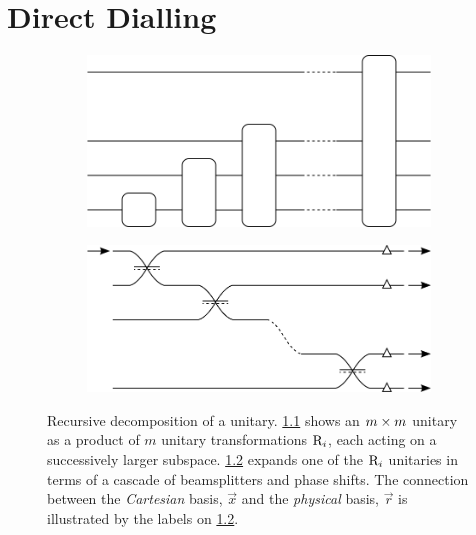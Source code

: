 \chapter{Direct Dialling}
\label{ch:DirectDialling}

\begin{figure}[t]
  \begin{subfigure}{0.52\textwidth}
    \includegraphics{figures/recursive}
    \caption{}
    \label{fig:recursive}
  \end{subfigure}
  \begin{subfigure}{0.48\textwidth}
    \includegraphics{figures/cascade}
    \caption{}
    \label{fig:cascade}
  \end{subfigure}
  \caption[Recursive decomposition of a unitary]
    {Recursive decomposition of a unitary. \ref{fig:recursive} shows an
    \(m \times m\) unitary as a product of \(m\) unitary transformations
    \(\mathrm{R}_{i}\), each acting on a successively larger subspace.
    \ref{fig:cascade} expands one of the \(\mathrm{R}_{i}\) unitaries in terms of
    a cascade of beamsplitters and phase shifts. The connection between the
    \emph{Cartesian} basis, \(\vec{x}\) and the \emph{physical} basis,
    \(\vec{r}\) is illustrated by the labels on \ref{fig:cascade}.}
  \label{fig:reck}
\end{figure}

